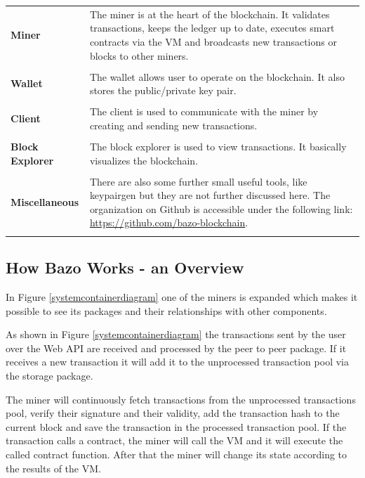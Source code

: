 \begin{tabular}[t]{ p{3cm} p{12.5cm}}
\textbf{Miner} &
The miner is at the heart of the blockchain. It validates transactions, keeps the ledger up to date, executes smart contracts via the VM and broadcasts new transactions or blocks to other miners. \\ \\
 
\raggedright
\textbf{Wallet} &
The wallet allows user to operate on the blockchain. It also stores the public/private key pair. \cite{ba_wallet} \\ \\
 
\textbf{Client} &
The client is used to communicate with the miner by creating and sending new transactions. \\ \\

\raggedright
\textbf{Block Explorer} & 
The block explorer is used to view transactions. It basically visualizes the blockchain. \\ \\

\raggedright
\textbf{Miscellaneous} & 
There are also some further small useful tools, like keypairgen but they are not further discussed here. The organization on Github is accessible under the following link: \href{https://github.com/bazo-blockchain}{https://github.com/bazo-blockchain}. \\ \\
\end{tabular}

\subsection{How Bazo Works - an Overview}
In Figure \ref{systemcontainerdiagram} one of the miners is expanded which makes it possible to see its packages and their relationships with other components. 

As shown in Figure \ref{systemcontainerdiagram} the transactions sent by the user over the Web API are received and processed by the peer to peer package. If it receives a new transaction it will add it to the unprocessed transaction pool via the storage package. 

The miner will continuously fetch transactions from the unprocessed transactions pool, verify their signature and their validity, add the transaction hash to the current block and save the transaction in the processed transaction pool. If the transaction calls a contract, the miner will call the VM and it will execute the called contract function. After that the miner will change its state according to the results of the VM.

